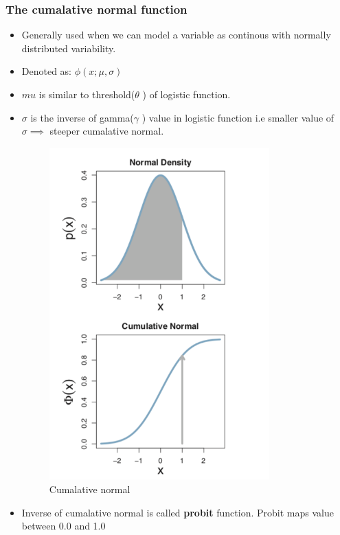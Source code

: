 \documentclass[a4paper]{article}
\begin{document}
\subsubsection{The cumalative normal function}
\begin{itemize}
    \item Generally used when we can model a variable as continous with normally distributed variability.
    \item Denoted as: $\phi(x; \mu, \sigma)$
    \item $mu$ is similar to threshold($\theta$ ) of logistic function.
    \item $\sigma$ is the inverse of gamma($\gamma$ ) value in logistic function i.e smaller value of $\sigma \implies$ steeper cumalative normal.
    \begin{figure}[H]
        \centering
        \includegraphics[width=0.8\textwidth]{cumalative_normal}
        \caption{Cumalative normal}
        \label{fig:cumalative_normal}
    \end{figure}
    \item Inverse of cumalative normal is called \textbf{probit} function. Probit maps value between 0.0 and 1.0 
\end{itemize}
\end{document}

